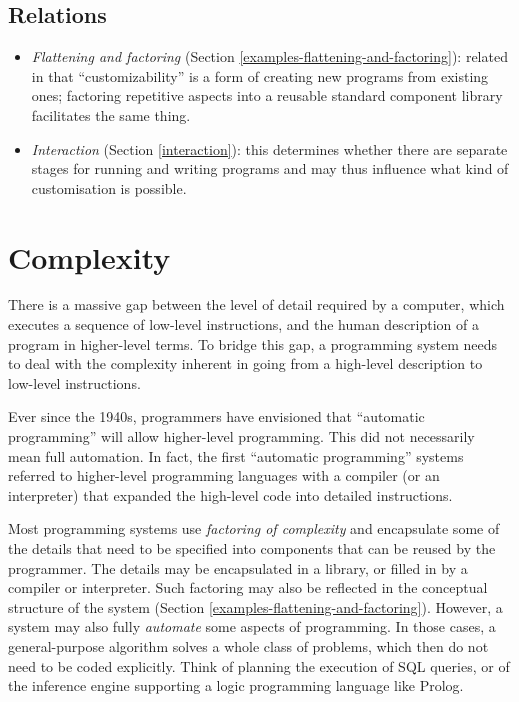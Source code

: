 \documentclass[ twoside,openright,titlepage,numbers=noenddot,headinclude,footinclude,cleardoublepage=empty,abstract=on,
                BCOR=5mm,paper=a4,fontsize=11pt
                ]{scrreprt}
\providecommand{\tightlist}{}\newenvironment{longtable}[2]{\begin{tabular}}{\end{tabular}}
\theoremstyle{definition}
\begin{document}
\hypertarget{relations-2}{\subsection{Relations}\label{relations-2}}

\begin{itemize}
\tightlist
\item
  \emph{Flattening and factoring} (Section
  \ref{examples-flattening-and-factoring}): related in that
  ``customizability'' is a form of creating new programs from existing
  ones; factoring repetitive aspects into a reusable standard component
  library facilitates the same thing.
\item
  \emph{Interaction} (Section \ref{interaction}): this determines
  whether there are separate stages for running and writing programs and
  may thus influence what kind of customisation is possible.
\end{itemize}

\hypertarget{complexity}{\section{Complexity}\label{complexity}}


There is a massive gap between the level of detail required by a
computer, which executes a sequence of low-level instructions, and the
human description of a program in higher-level terms. To bridge this
gap, a programming system needs to deal with the complexity inherent in
going from a high-level description to low-level instructions.

Ever since the 1940s, programmers have envisioned that ``automatic
programming'' will allow higher-level programming. This did not
necessarily mean full automation. In fact, the first ``automatic
programming'' systems referred to higher-level programming languages
with a compiler (or an interpreter) that expanded the high-level code
into detailed instructions.

Most programming systems use \emph{factoring of complexity} and
encapsulate some of the details that need to be specified into
components that can be reused by the programmer. The details may be
encapsulated in a library, or filled in by a compiler or interpreter.
Such factoring may also be reflected in the conceptual structure of the
system (Section \ref{examples-flattening-and-factoring}). However, a
system may also fully \emph{automate} some aspects of programming. In
those cases, a general-purpose algorithm solves a whole class of
problems, which then do not need to be coded explicitly. Think of
planning the execution of SQL queries, or of the inference engine
supporting a logic programming language like Prolog.
\end{document}
